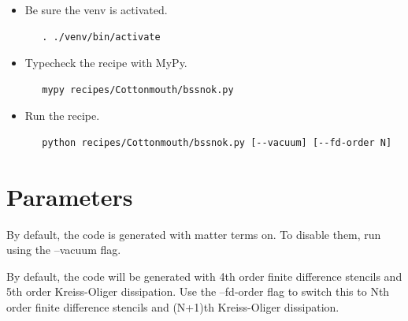 \documentclass{article}
\begin{document}
\begin{itemize}
\item Be sure the venv is activated.
   \begin{verbatim}
   . ./venv/bin/activate
   \end{verbatim}

\item Typecheck the recipe with MyPy.
   \begin{verbatim}
   mypy recipes/Cottonmouth/bssnok.py
   \end{verbatim}

\item Run the recipe.
   \begin{verbatim}
   python recipes/Cottonmouth/bssnok.py [--vacuum] [--fd-order N]
   \end{verbatim}
\end{itemize}

\section{Parameters}

By default, the code is generated with matter terms on. To disable them, run using the --vacuum flag.

By default, the code will be generated with 4th order finite difference stencils and 5th order Kreiss-Oliger dissipation. Use the --fd-order flag to switch this to Nth order finite difference stencils and (N+1)th Kreiss-Oliger dissipation.

\end{document}
